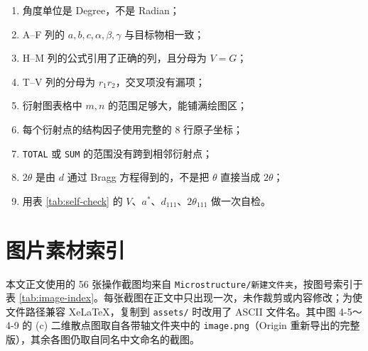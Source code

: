 \begin{enumerate}[label=（\arabic*）,leftmargin=2.2em,itemsep=1pt]
  \item 角度单位是 Degree，不是 Radian；
  \item A--F 列的 $a,b,c,\alpha,\beta,\gamma$ 与目标物相一致；
  \item H--M 列的公式引用了正确的列，且分母为 $V=G$；
  \item T--V 列的分母为 $r_1r_2$，交叉项没有漏项；
  \item 衍射图表格中 $m,n$ 的范围足够大，能铺满绘图区；
  \item 每个衍射点的结构因子使用完整的 8 行原子坐标；
  \item \texttt{TOTAL} 或 \texttt{SUM} 的范围没有跨到相邻衍射点；
  \item $2\theta$ 是由 $d$ 通过 Bragg 方程得到的，不是把 $\theta$ 直接当成 $2\theta$；
  \item 用表 \ref{tab:self-check} 的 $V$、$a^*$、$d_{111}$、$2\theta_{111}$ 做一次自检。
\end{enumerate}

\section{图片素材索引}

本文正文使用的 56 张操作截图均来自 \texttt{Microstructure/新建文件夹}，按图号索引于表 \ref{tab:image-index}。每张截图在正文中只出现一次，未作裁剪或内容修改；为使文件路径兼容 XeLaTeX，复制到 \texttt{assets/} 时改用了 ASCII 文件名。其中图 4-5～4-9 的 (c) 二维散点图取自各带轴文件夹中的 \texttt{image.png}（Origin 重新导出的完整版），其余各图仍取自同名中文命名的截图。

